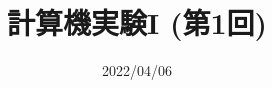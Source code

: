 \documentclass[10pt,dvipdfmx]{beamer}
\title{計算機実験I (第1回)}
\date{2022/04/06}
\begin{document}
\begin{frame}
  \titlepage
  \tableofcontents
\end{frame}









\end{document}
